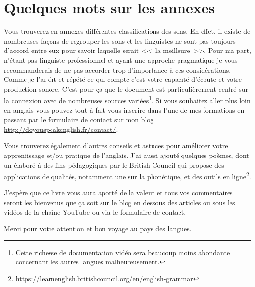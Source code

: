 \chapter{Quelques mots sur les annexes}\label{chap:mots-annex}

Vous trouverez en annexes différentes classifications des sons. En
effet, il existe de nombreuses façons de regrouper les sons et les
linguistes ne sont pas toujours d'accord entre eux pour savoir
laquelle serait <<~la meilleure~>>. Pour ma part, n'étant pas
linguiste professionnel et ayant une approche pragmatique je vous
recommanderais de ne pas accorder trop d'importance à ces
considérations. Comme je l'ai dit et répété ce qui compte c'est votre
capacité d'écoute et votre production sonore. C'est pour ça que le
document est particulièrement centré sur la connexion avec de
nombreuses sources variées\footnote{Cette richesse de documentation
  vidéo sera beaucoup moins abondante concernant les autres
  langues malheureusement.}.
Si vous souhaitez aller plus loin en anglais vous pouvez tout à fait
vous inscrire dans l'une de mes formations en passant par le
formulaire de contact sur mon blog
\url{http://doyouspeakenglish.fr/contact/}.

Vous trouverez également d'autres conseils et astuces pour améliorer
votre apprentissage et/ou pratique de l'anglais. J'ai aussi ajouté
quelques poèmes, dont un élaboré à des fins pédagogiques par le
British Council qui propose des applications de qualités, notamment
une sur la phonétique, et des
\href{https://learnenglish.britishcouncil.org/en/english-grammar}{outils
  en
  ligne}\footnote{\url{https://learnenglish.britishcouncil.org/en/english-grammar}}.

J'espère que ce livre vous aura aporté de la valeur et tous vos
commentaires seront les bienvenus que ça soit sur le blog en dessous
des articles ou sous les vidéos de la chaîne YouTube ou via le
formulaire de contact.

Merci pour votre attention et bon voyage au pays des langues.
